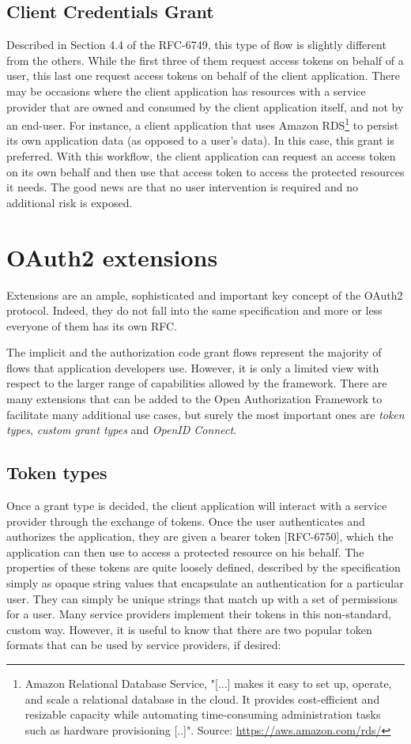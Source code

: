 \subsection{Client Credentials Grant}
Described in Section 4.4 of the RFC-6749, this type of flow is slightly different from the others. While the first three of them request access tokens on behalf of a user, this last one request access tokens on behalf of the client application. There may be occasions where the client application has resources with a service provider that are owned and consumed by the client application itself, and not by an end-user. For instance, a client application that uses Amazon RDS\footnote{Amazon Relational Database Service, "[...] makes it easy to set up, operate, and scale a relational database in the cloud. It provides cost-efficient and resizable capacity while automating time-consuming administration tasks such as hardware provisioning [..]". Source: \url{https://aws.amazon.com/rds/}} to persist its own application data (as opposed to a user's data). In this case, this grant is preferred. With this workflow, the client application can request an access token on its own behalf and then use that access token to access the protected resources it needs. The good news are that no user intervention is required and no additional risk is exposed.

\section{OAuth2 extensions}
Extensions are an ample, sophisticated and important key concept of the OAuth2 protocol. Indeed, they do not fall into the same specification and more or less everyone of them has its own RFC.

The implicit and the authorization code grant flows represent the majority of flows that application developers use. However, it is only a limited view with respect to the larger range of capabilities allowed by the framework. There are many extensions that can be added to the Open Authorization Framework to facilitate many additional use cases, but surely the most important ones are \textit{token types}, \textit{custom grant types} and \textit{OpenID Connect}.

\subsection{Token types}
Once a grant type is decided, the client application will interact with a service provider through the exchange of tokens. Once the user authenticates and authorizes the application, they are given a bearer token [RFC-6750], which the application can then use to access a protected resource on his behalf. The properties of these tokens are quite loosely defined, described by the specification simply as opaque string values that encapsulate an authentication for a particular user. They can simply be unique strings that match up with a set of permissions for a user. Many service providers implement their tokens in this non-standard, custom way. However, it is useful to know that there are two popular token formats that can be used by service providers, if desired:


